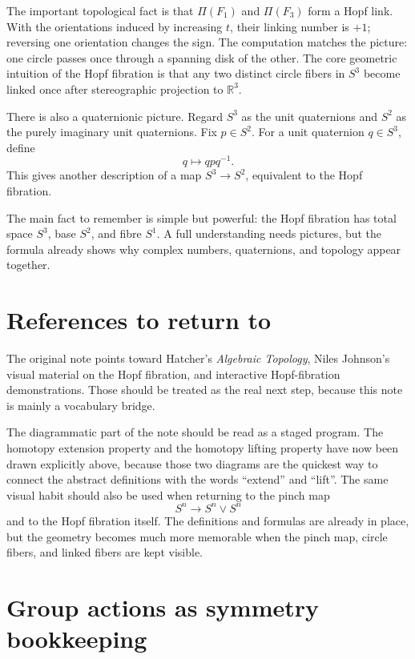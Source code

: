 The important topological fact is that \(\Pi(F_1)\) and \(\Pi(F_3)\) form a Hopf link.  With the orientations induced by increasing \(t\), their linking number is \(+1\); reversing one orientation changes the sign.  The computation matches the picture: one circle passes once through a spanning disk of the other.  The core geometric intuition of the Hopf fibration is that any two distinct circle fibers in \(S^3\) become linked once after stereographic projection to \(\mathbb R^3\).

There is also a quaternionic picture.  Regard \(S^3\) as the unit quaternions and \(S^2\) as the purely imaginary unit quaternions.  Fix \(p\in S^2\).  For a unit quaternion \(q\in S^3\), define
\[
  q\mapsto qpq^{-1}.
\]
This gives another description of a map \(S^3\to S^2\), equivalent to the Hopf fibration.

\begin{remark}
The main fact to remember is simple but powerful: the Hopf fibration has total space \(S^3\), base \(S^2\), and fibre \(S^1\).  A full understanding needs pictures, but the formula already shows why complex numbers, quaternions, and topology appear together.
\end{remark}

\section{References to return to}

The original note points toward Hatcher's \emph{Algebraic Topology}, Niles Johnson's visual material on the Hopf fibration, and interactive Hopf-fibration demonstrations.  Those should be treated as the real next step, because this note is mainly a vocabulary bridge.

The diagrammatic part of the note should be read as a staged program.  The homotopy extension property and the homotopy lifting property have now been drawn explicitly above, because those two diagrams are the quickest way to connect the abstract definitions with the words ``extend'' and ``lift''.  The same visual habit should also be used when returning to the pinch map
\[
  S^n\to S^n\vee S^n
\]
and to the Hopf fibration itself.  The definitions and formulas are already in place, but the geometry becomes much more memorable when the pinch map, circle fibers, and linked fibers are kept visible.


\section{Group actions as symmetry bookkeeping}

